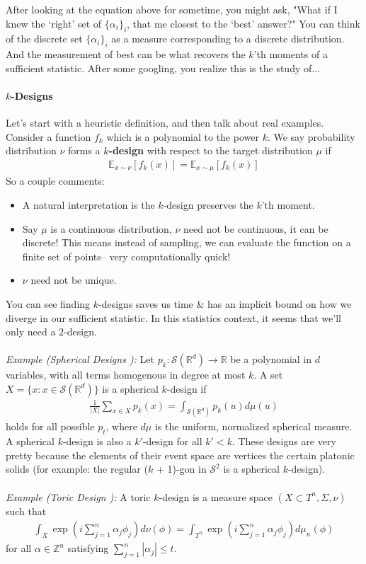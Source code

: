 \documentclass{article}
\begin{document}
After looking at the equation above for sometime, you might ask, "What if I knew the `right' set of $\{\alpha_i\}_i$, that me closest to the `best' answer?" You can think of the discrete set $\{\alpha_i\}_i$ as a measure corresponding to a discrete distribution. And the measurement of best can be what recovers the $k$'th moments of a sufficient statistic. After some googling, you realize this is the study of...

\paragraph{$k$-Designs}
Let's start with a heuristic definition, and then talk about real examples. Consider a function $f_k$ which is a polynomial to the power $k$. We say probability distribution $\nu$ forms a \textbf{$k$-design} with respect to the target distribution $\mu$ if
\begin{align}
	\mathbb E_{x \sim \nu}[f_k(x)] = \mathbb E_{x \sim \mu}[f_k(x)]
\end{align}
So a couple comments:
\begin{itemize}
	\item A natural interpretation is the $k$-design preserves the $k$'th moment.
	\item Say $\mu$ is a continuous distribution, $\nu$ need not be continuous, it can be discrete! This means instead of sampling, we can evaluate the function on a finite set of points-- very computationally quick! 
	\item $\nu$ need not be unique.
\end{itemize}
You can see finding $k$-designs saves us time \& has an implicit bound on how we diverge in our sufficient statistic. In this statistics context, it seems that we'll only need a $2$-design.
\\
\\
\emph{Example (Spherical Designs \cite{colbourn2006handbook, delsarte1977spherical}):} Let $p_k : \mathcal S(\mathbb R^d) \to \mathbb R$ be a polynomial in $d$ variables, with all terms homogenous in degree at most $k$. A set $X = \{x : x \in \mathcal S(\mathbb R^d)\}$ is a spherical $k$-design if 
\begin{align}
	\frac{1}{|X|} \sum_{x \in X}p_k(x) = \int_{\mathcal S(\mathbb R^d)} p_k(u) d\mu(u)
\end{align} holds for all possible $p_t$, where $d\mu$ is the uniform, normalized spherical measure. A spherical $k$-design is also a $k'$-design for all $k' < k$. These designs are very pretty because the elements of their event space are vertices the certain platonic solids (for example: the regular ($k$ + 1)-gon in $\mathcal S^2$ is a spherical $k$-design).
\\
\\
\emph{Example (Toric Design \cite{Iosue2024projectivetoric}):} A toric $k$-design is a measure space $(X \subset T^n, \Sigma, \nu)$ such that
\begin{align}
	\int_X \exp\left( i \sum_{j=1}^n \alpha_j \phi_j \right) d\nu(\phi) = \int_{T^n} \exp \left( i \sum_{j=1}^n \alpha_j \phi_j\right) d\mu_n (\phi)
\end{align}
for all $\alpha \in \mathbb Z^n$ satisfying $\sum_{j=1}^n |\alpha_j| \leq t$.
\end{document}
